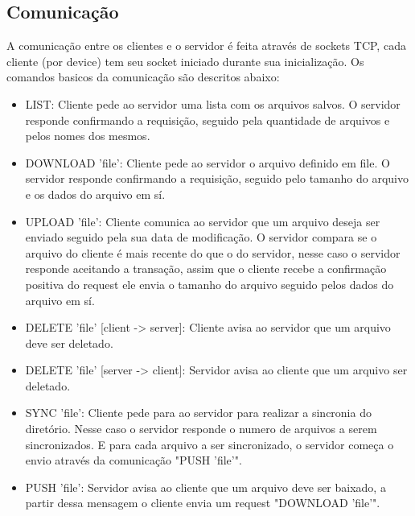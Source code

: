 \documentclass[a4paper]{article}
\begin{document}
\subsection{Comunicação}
A comunicação entre os clientes e o servidor é feita através de sockets TCP, cada cliente (por device) tem seu socket iniciado durante sua inicialização. Os comandos basicos da comunicação são descritos abaixo:
\begin{itemize}
\item LIST:
\newline Cliente pede ao servidor uma lista com os arquivos salvos. O servidor responde confirmando a requisição, seguido pela quantidade de arquivos e pelos nomes dos mesmos.

\item DOWNLOAD 'file':
\newline Cliente pede ao servidor o arquivo definido em file. O servidor responde confirmando a requisição, seguido pelo tamanho do arquivo e os dados do arquivo em sí.

\item UPLOAD 'file':
\newline Cliente comunica ao servidor que um arquivo deseja ser enviado seguido pela sua data de modificação. O servidor compara se o arquivo do cliente é mais recente do que o do servidor, nesse caso o servidor responde aceitando a transação, assim que o cliente recebe a confirmação positiva do request ele envia o tamanho do arquivo seguido pelos dados do arquivo em sí.

\item DELETE 'file' [client -> server]:
\newline Cliente avisa ao servidor que um arquivo deve ser deletado.

\item DELETE 'file' [server -> client]:
\newline Servidor avisa ao cliente que um arquivo ser deletado.

\item SYNC 'file':
\newline Cliente pede para ao servidor para realizar a sincronia do diretório. Nesse caso o servidor responde o numero de arquivos a serem sincronizados. E para cada arquivo a ser sincronizado, o servidor começa o envio através da comunicação "PUSH 'file'".

\item PUSH 'file':
\newline Servidor avisa ao cliente que um arquivo deve ser baixado, a partir dessa mensagem o cliente envia um request "DOWNLOAD 'file'".

\end{itemize}
\end{document}
